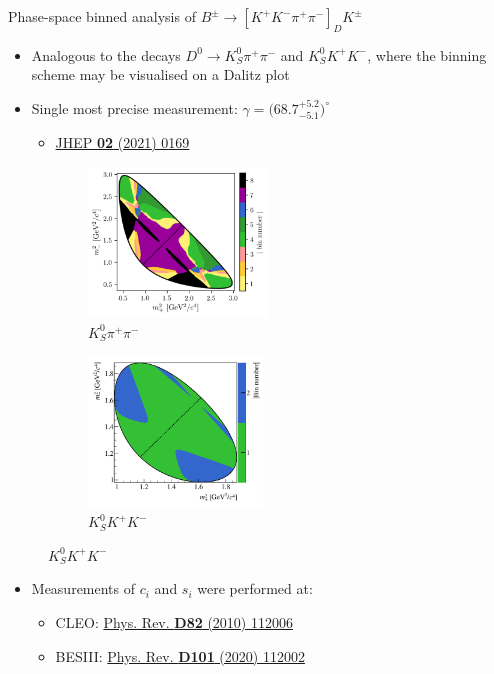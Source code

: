 \documentclass{beamer}
\begin{document}
\begin{frame}{Phase-space binned analysis of $B^\pm\to[K^+K^-\pi^+\pi^-]_DK^\pm$}
  \begin{itemize}
    \setlength\itemsep{0.5em}
    \item{Analogous to the decays $D^0\to K_S^0\pi^+\pi^-$ and $K_S^0K^+K^-$, where the binning scheme may be visualised on a Dalitz plot}
    \item{Single most precise measurement: $\gamma = \big(68.7^{+5.2}_{-5.1}\big)^\circ$}
    \begin{itemize}
      \item{\href{https://link.springer.com/article/10.1007/JHEP02(2021)169}{JHEP \textbf{02} (2021) 0169}}
    \end{itemize}
  \end{itemize}
  \begin{figure}
    \begin{subfigure}{0.45\textwidth}
      \includegraphics[height = 4.0cm]{Plots/KsPiPi_optimal.png}
      \vspace{-0.3cm}
      \caption*{$K_S^0\pi^+\pi^-$}
    \end{subfigure}%
    \begin{subfigure}{0.45\textwidth}
      \includegraphics[height = 4.0cm]{Plots/KsKK_binning.png}
      \vspace{-0.3cm}
      \caption*{$K_S^0K^+K^-$}
    \end{subfigure}
  \end{figure}
  \vspace{-0.3cm}
  \begin{itemize}
    \setlength\itemsep{1.0em}
    \item{Measurements of $c_i$ and $s_i$ were performed at:}
    \begin{itemize}
      \item{CLEO: \href{https://doi.org/10.1103/PhysRevD.82.112006}{Phys. Rev. \textbf{D82} (2010) 112006}}
      \item{BESIII: \href{https://journals.aps.org/prd/abstract/10.1103/PhysRevD.101.112002}{Phys. Rev. \textbf{D101} (2020) 112002}}
    \end{itemize}
  \end{itemize}
\end{frame}
\end{document}
